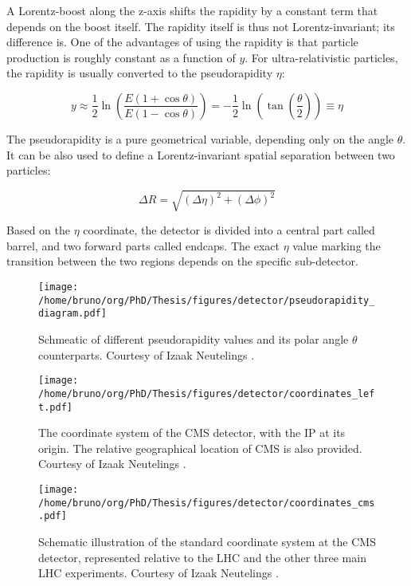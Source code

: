 \documentclass[11pt]{article}
\begin{document}
A Lorentz-boost along the z-axis shifts the rapidity by a constant term that depends on the boost itself.
The rapidity itself is thus not Lorentz-invariant; its difference is.
One of the advantages of using the rapidity is that particle production is roughly constant as a function of \(y\).
For ultra-relativistic particles, the rapidity is usually converted to the pseudorapidity \(\eta\):


\begin{equation}
\label{eq:pseudo-rapidity}
y \approx \frac{1}{2} \ln \left( \frac{E(1 + \cos \theta)}{E(1 - \cos \theta)} \right)
= -\frac{1}{2} \ln \left( \tan \left( \frac{\theta}{2} \right) \right)
\equiv \eta
\end{equation}

The pseudorapidity is a pure geometrical variable, depending only on the angle \(\theta\).
It can be also used to define a Lorentz-invariant spatial separation between two particles:

\begin{equation}
\label{eq:deltar}
\Delta R = \sqrt{(\Delta \eta)^2 + (\Delta \phi)^2}
\end{equation}

Based on the \(\eta\) coordinate, the detector is divided into a central part called barrel, and two forward parts called endcaps.
The exact \(\eta\) value marking the transition between the two regions depends on the specific sub-detector.

\begin{figure}
\texttt{[image: /home/bruno/org/PhD/Thesis/figures/detector/pseudorapidity\_diagram.pdf]}
\caption{\label{fig:pseudorapidity}Schmeatic of different pseudorapidity values and its polar angle \(\theta\) counterparts. Courtesy of Izaak Neutelings \cite{izaak_neutelings}.}
\end{figure}

\begin{figure}
\texttt{[image: /home/bruno/org/PhD/Thesis/figures/detector/coordinates\_left.pdf]}
\caption{\label{fig:cords_cms}The coordinate system of the CMS detector, with the \ac{IP} at its origin. The relative geographical location of \ac{CMS} is also provided. Courtesy of Izaak Neutelings \cite{izaak_neutelings}.}
\end{figure}

\begin{figure}
\texttt{[image: /home/bruno/org/PhD/Thesis/figures/detector/coordinates\_cms.pdf]}
\caption{\label{fig:cords_lhc}Schematic illustration of the standard coordinate system at the CMS detector, represented relative to the \ac{LHC} and the other three main LHC experiments. Courtesy of Izaak Neutelings \cite{izaak_neutelings}.}
\end{figure}
\end{document}
